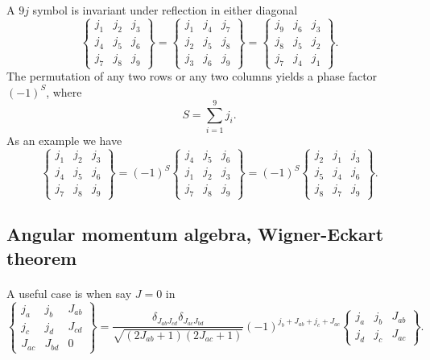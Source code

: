 \documentclass[%
twoside,                 %
final,                   %
10pt]{article}
\begin{document}
\paragraph{}
A $9j$ symbol is invariant under reflection in either diagonal
\[
    \begin{Bmatrix} j_1 & j_2 & j_3\\ j_4 & j_5 & j_6\\ j_7 & j_8 & j_9 \end{Bmatrix} = \begin{Bmatrix} j_1 & j_4 & j_7\\ j_2 & j_5 & j_8\\ j_3 & j_6 & j_9 \end{Bmatrix} = \begin{Bmatrix} j_9 & j_6 & j_3\\ j_8 & j_5 & j_2\\ j_7 & j_4 & j_1 \end{Bmatrix}. 
\]
The permutation of any two rows or any two columns yields a phase factor $(-1)^S$, where
\[
    S=\sum_{i=1}^9 j_i. 
\]
As an  example we have
\[
    \begin{Bmatrix} j_1 & j_2 & j_3\\ j_4 & j_5 & j_6\\ j_7 & j_8 & j_9 \end{Bmatrix} = (-1)^S \begin{Bmatrix} j_4 & j_5 & j_6\\ j_1 & j_2 & j_3\\ j_7 & j_8 & j_9 \end{Bmatrix} = (-1)^S \begin{Bmatrix} j_2 & j_1 & j_3\\ j_5 & j_4 & j_6\\ j_8 & j_7 & j_9 \end{Bmatrix}. 
\]



\subsection{Angular momentum algebra, Wigner-Eckart theorem}

\paragraph{}
A useful case is when say $J=0$ in 
\[
\left\{\begin{array}{ccc} j_a & j_b& J_{ab} \\ j_c & j_d & J_{cd} \\ J_{ac} & J_{bd}& 0\end{array}\right\}=\frac{\delta_{J_{ab}J_{cd}} \delta_{J_{ac}J_{bd}}}{\sqrt{(2J_{ab}+1)(2J_{ac}+1)}} (-1)^{j_b+J_{ab}+j_c+J_{ac}} \begin{Bmatrix} j_a & j_b & J_{ab}\\ j_d & j_c & J_{ac} \end{Bmatrix}. 
\]
\end{document}
